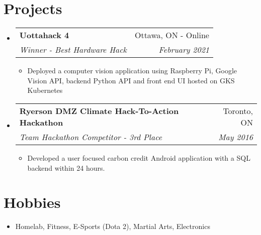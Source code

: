 \documentclass[letterpaper,11pt]{article}
\makeatletter
\newcommand{\resumeItem}[2]{
  \item\small{
    \textbf{#1}{#2 \vspace{-2pt}}
  }
}
\newcommand{\resumeSubheading}[4]{
  \vspace{-1pt}\item
    \begin{tabular*}{0.97\textwidth}[t]{l@{\extracolsep{\fill}}r}
      \textbf{#1} & #2 \\
      \textit{\small#3} & \textit{\small #4} \\
    \end{tabular*}\vspace{-5pt}
}
\newcommand{\resumeSubSubheading}[2]{
    \begin{tabular*}{0.97\textwidth}{l@{\extracolsep{\fill}}r}
      \textit{\small#1} & \textit{\small #2} \\
    \end{tabular*}\vspace{-5pt}
}
\newcommand{\resumeSubHeadingListStart}{\begin{itemize}[leftmargin=*]}
\newcommand{\resumeSubHeadingListEnd}{\end{itemize}}
\newcommand{\resumeItemListStart}{\begin{itemize}}
\newcommand{\resumeItemListEnd}{\end{itemize}\vspace{-5pt}}
\makeatother
\begin{document}
      


\section{Projects}
  \resumeSubHeadingListStart
	\resumeSubheading
	{Uottahack 4}{Ottawa, ON - Online}
	{Winner - Best Hardware Hack}{February 2021}
		\resumeItemListStart
			\resumeItem{}
			{Deployed a computer vision application using Raspberry Pi, Google Vision API, backend Python API and front end UI hosted on GKS Kubernetes }
		\resumeItemListEnd
\resumeSubheading
	{Ryerson DMZ Climate Hack-To-Action Hackathon}{Toronto, ON}
	{Team Hackathon Competitor - 3rd Place }{May 2016}
		\resumeItemListStart
			\resumeItem{}
			{Developed a user focused carbon credit Android application with a SQL backend within 24 hours.}
		\resumeItemListEnd
    
  \resumeSubHeadingListEnd

%	
\section{Hobbies}
	\resumeSubHeadingListStart
	\item{
	\textbf{}{Homelab, Fitness, E-Sports (Dota 2), Martial Arts, Electronics}
	}
	\resumeSubHeadingListEnd
  
\end{document}
